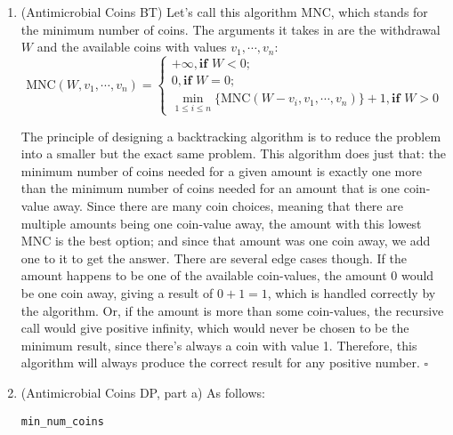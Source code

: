 \documentclass{article}
\begin{document}
\begin{enumerate}

  \item (Antimicrobial Coins BT) Let's call this algorithm MNC, which stands for the minimum number of coins. The arguments it takes in are the withdrawal $W$ and the available coins with values $v_1, \cdots, v_n$:
    $$
      \text{MNC}(W, v_1, \cdots, v_n) = \begin{cases}
        +\infty, \textbf{if }W < 0; \\
        0, \textbf{if }W = 0;       \\
        \min_{1 \le i \le n}\{\text{MNC}(W-v_i, v_1, \cdots, v_n)\} + 1, \textbf{if }W > 0
      \end{cases}
    $$

    The principle of designing a backtracking algorithm is to reduce the problem into a smaller but the exact same problem. This algorithm does just that: the minimum number of coins needed for a given amount is exactly one more than the minimum number of coins needed for an amount that is one coin-value away. Since there are many coin choices, meaning that there are multiple amounts being one coin-value away, the amount with this lowest MNC is the best option; and since that amount was one coin away, we add one to it to get the answer. There are several edge cases though. If the amount happens to be one of the available coin-values, the amount 0 would be one coin away, giving a result of $0+1=1$, which is handled correctly by the algorithm. Or, if the amount is more than some coin-values, the recursive call would give positive infinity, which would never be chosen to be the minimum result, since there's always a coin with value 1. Therefore, this algorithm will always produce the correct result for any positive number. $\square$

    \pagebreak

  \item (Antimicrobial Coins DP, part a) As follows:

    \begin{center}
      \begin{minipage}{0.625\linewidth}
        \renewcommand{\thealgocf}{}
        \begin{algorithm}[H]
          \caption{\tt min\_num\_coins}

          \texttt{\\}


\end{algorithm}
\end{minipage}
\end{center}
\end{enumerate}
\end{document}
